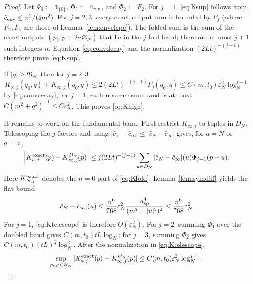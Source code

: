 \documentclass[11pt,a4paper]{article}
\theoremstyle{plain}
\theoremstyle{definition}
\newcommand{\eps}{\varepsilon}
\begin{document}
\begin{proof}
Let $\Phi_0:=\mathbf1_{\{0\}}$, $\Phi_1:=\hat c_{\rm env}$, and
$\Phi_2:=F_2$.  For $j=1$, \eqref{eq:Ksup} follows from
$\hat c_{\rm env}\le\pi^2/(4m^2)$.  For $j=2,3$, every exact-output sum is
bounded by $F_j$ (where $F_2,F_3$ are those of
Lemma~\ref{lem:envelope}).  The folded sum is the sum of the exact outputs
$(p_0,p+2n\mathfrak R_N)$ that lie in the $j$-fold band; there are at most
$j+1$ such integers $n$.  Equation \eqref{eq:convdecay} and the normalization
$(2Lt)^{-(j-1)}$ therefore prove \eqref{eq:Ksup}.

If $|q|\ge\mathfrak R_N$, then for $j=2,3$
\[
 K_{\times,j}(q_0,q)+K_{\infty,j}(q_0,q)
 \le2(2Lt)^{-(j-1)}F_j(q_0,q)
 \le C(m,t_0)\eps_N^2\log_N^{j-1}
\]
by \eqref{eq:convdecay}; for $j=1$, each nonzero summand is at most
$C(m^2+q^2)^{-1}\le C\eps_N^2$.  This proves \eqref{eq:Khigh}.

It remains to work on the fundamental band.  First restrict
$K_{\infty,j}$ to tuples in $D_N$.  Telescoping the $j$ factors and using
$|\hat c_\times-\hat c_\infty|\le|\hat c_N-\hat c_\infty|$ gives, for
$a=N$ or $a=\times$,
\begin{equation}
 \left|K_{a,j}^{\rm exact}(p)-K_{\infty,j}^{D_N}(p)\right|
 \le j(2Lt)^{-(j-1)}
 \sum_{u\in D_N}|\hat c_N-\hat c_\infty|(u)\Phi_{j-1}(p-u).
 \label{eq:Ktelescope}
\end{equation}
Here $K_{N,j}^{\rm exact}$ denotes the $n=0$ part of \eqref{eq:Kfold}.
Lemma~\ref{lem:symdiff} yields the flat bound
\begin{equation}
 |\hat c_N-\hat c_\infty|(u)
 \le\frac{\pi^6}{768}\eps_N^2
       \frac{u_{\rm sp}^4}{(m^2+|u|^2)^2}
 \le\frac{\pi^6}{768}\eps_N^2 .                                      \label{eq:symdiffflat}
\end{equation}
For $j=1$, \eqref{eq:Ktelescope} is therefore $O(\eps_N^2)$.  For
$j=2$, summing $\Phi_1$ over the doubled band gives
$C(m,t_0)tL\log_N$; for $j=3$, summing $\Phi_2$ gives
$C(m,t_0)(tL)^2\log_N^2$.  After the normalization in
\eqref{eq:Ktelescope},
\begin{equation}
 \sup_{p_0,p\in B_N}
 |K_{a,j}^{\rm exact}(p)-K_{\infty,j}^{D_N}(p)|
 \le C(m,t_0)\eps_N^2\log_N^{j-1}.                                  \label{eq:Kexactdiff}
\end{equation}


\end{proof}
\end{document}
